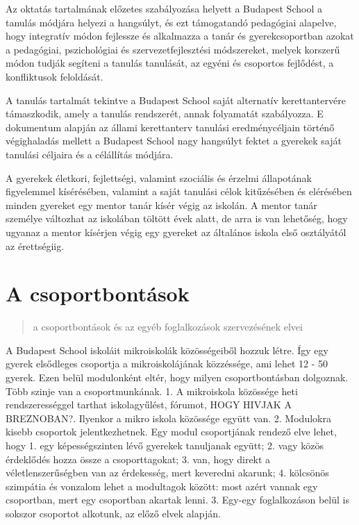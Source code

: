 Az oktatás tartalmának előzetes szabályozása helyett a Budapest School a
tanulás módjára helyezi a hangsúlyt, és ezt támogatandó pedagógiai alapelve,
hogy
integratív módon fejlessze és alkalmazza a tanár és gyerekcsoportban
azokat a pedagógiai, pszichológiai és szervezetfejlesztési módszereket,
melyek korszerű módon tudják segíteni a tanulás tanulását, az egyéni és
csoportos fejlődést, a konfliktusok feloldását.

A tanulás tartalmát tekintve a Budapest School saját alternatív
kerettantervére támaszkodik, amely a tanulás rendszerét, annak
folyamatát szabályozza. E dokumentum alapján az állami kerettanterv
tanulási eredménycéljain történő végighaladás mellett a Budapest School
nagy hangsúlyt fektet a gyerekek saját tanulási céljaira és a
célállítás módjára.

A gyerekek életkori, fejlettségi, valamint szociális és érzelmi
állapotának figyelemmel kísérésében, valamint a saját tanulási célok
kitűzésében és elérésében minden gyereket egy mentor tanár kísér végig
az iskolán. A mentor tanár személye változhat az iskolában töltött évek
alatt, de arra is van lehetőség, hogy ugyanaz a mentor kísérjen végig
egy gyereket az általános iskola első osztályától az érettségiig.




\section{A csoportbontások}

\begin{quote}
  a csoportbontások és az egyéb foglalkozások szervezésének elvei
\end{quote}

A Budapest School iskoláit mikroiskolák közösségeiből hozzuk létre. Így
egy gyerek elsődleges csoportja a mikroiskolájának közzéssége, ami lehet
12 - 50 gyerek. Ezen belül modulonként eltér, hogy milyen
csoportbontásban dolgoznak. Több szinje van a csoportmunkának. 1. A
mikroiskola közössége heti rendszerességgel tarthat iskolagyűlést,
fórumot, HOGY HIVJAK A BREZNOBAN?. Ilyenkor a mikro iskola közössége
együtt van. 2. Modulokra kisebb csoportok jelentkezhetnek. Egy modul
csoportjának rendező elve lehet, hogy 1. egy képességszinten lévő
gyerekek tanuljanak együtt; 2. vagy közös érdeklődés hozza össze a
csoporttagokat; 3. van, hogy direkt a véletlenszerűségben van az
érdekesség, mert keveredni akarunk; 4. kölcsönös szimpátia és vonzalom
lehet a modultagok között: most azért vannak egy csoportban, mert egy
csoportban akartak lenni. 3. Egy-egy foglalkozáson belül is sokszor
csoportot alkotunk, az előző elvek alapján.

